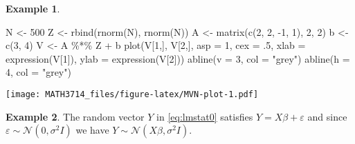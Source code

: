 \documentclass[
  a4paper,
]{article}
\newenvironment{Shaded}{\begin{snugshade}}{\end{snugshade}}
\newcommand{\AttributeTok}[1]{\textcolor[rgb]{0.77,0.63,0.00}{#1}}
\newcommand{\DecValTok}[1]{\textcolor[rgb]{0.00,0.00,0.81}{#1}}
\newcommand{\FunctionTok}[1]{\textcolor[rgb]{0.00,0.00,0.00}{#1}}
\newcommand{\NormalTok}[1]{#1}
\newcommand{\OtherTok}[1]{\textcolor[rgb]{0.56,0.35,0.01}{#1}}
\newcommand{\SpecialCharTok}[1]{\textcolor[rgb]{0.00,0.00,0.00}{#1}}
\newcommand{\StringTok}[1]{\textcolor[rgb]{0.31,0.60,0.02}{#1}}
\theoremstyle{definition}
\theoremstyle{definition}
\newtheorem{example}{Example}[section]
\theoremstyle{definition}
\theoremstyle{definition}
\theoremstyle{remark}
\begin{document}
\begin{example}
\begin{Shaded}
\begin{Highlighting}[]
\NormalTok{N }\OtherTok{\textless{}{-}} \DecValTok{500}
\NormalTok{Z }\OtherTok{\textless{}{-}} \FunctionTok{rbind}\NormalTok{(}\FunctionTok{rnorm}\NormalTok{(N), }\FunctionTok{rnorm}\NormalTok{(N))}
\NormalTok{A }\OtherTok{\textless{}{-}} \FunctionTok{matrix}\NormalTok{(}\FunctionTok{c}\NormalTok{(}\DecValTok{2}\NormalTok{, }\DecValTok{2}\NormalTok{, }\SpecialCharTok{{-}}\DecValTok{1}\NormalTok{, }\DecValTok{1}\NormalTok{), }\DecValTok{2}\NormalTok{, }\DecValTok{2}\NormalTok{)}
\NormalTok{b }\OtherTok{\textless{}{-}} \FunctionTok{c}\NormalTok{(}\DecValTok{3}\NormalTok{, }\DecValTok{4}\NormalTok{)}
\NormalTok{V }\OtherTok{\textless{}{-}}\NormalTok{ A }\SpecialCharTok{\%*\%}\NormalTok{ Z }\SpecialCharTok{+}\NormalTok{ b}
\FunctionTok{plot}\NormalTok{(V[}\DecValTok{1}\NormalTok{,], V[}\DecValTok{2}\NormalTok{,], }\AttributeTok{asp =} \DecValTok{1}\NormalTok{, }\AttributeTok{cex =}\NormalTok{ .}\DecValTok{5}\NormalTok{,}
     \AttributeTok{xlab =} \FunctionTok{expression}\NormalTok{(V[}\DecValTok{1}\NormalTok{]),}
     \AttributeTok{ylab =} \FunctionTok{expression}\NormalTok{(V[}\DecValTok{2}\NormalTok{]))}
\FunctionTok{abline}\NormalTok{(}\AttributeTok{v =} \DecValTok{3}\NormalTok{, }\AttributeTok{col =} \StringTok{"grey"}\NormalTok{)}
\FunctionTok{abline}\NormalTok{(}\AttributeTok{h =} \DecValTok{4}\NormalTok{, }\AttributeTok{col =} \StringTok{"grey"}\NormalTok{)}
\end{Highlighting}
\end{Shaded}

\texttt{[image: MATH3714\_files/figure-latex/MVN-plot-1.pdf]}
\end{example}

\begin{example}
The random vector \(Y\) in \eqref{eq:lmstat0} satisfies \(Y = X \beta + \varepsilon\)
and since \(\varepsilon\sim \mathcal{N}(0, \sigma^2 I)\) we have
\(Y \sim \mathcal{N}(X\beta, \sigma^2 I)\).
\end{example}
\end{document}
